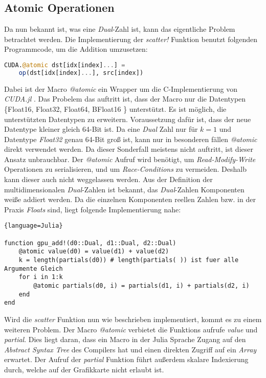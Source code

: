 \subsection{Atomic Operationen} \label{sec:atomic}

Da nun bekannt ist, was eine \textit{Dual}-Zahl ist, 
kann das eigentliche Problem betrachtet werden.
Die Implementierung der \textit{scatter!} Funktion benutzt folgenden Programmcode, um die 
Addition umzusetzen:

\begin{lstlisting}[language=Julia]
CUDA.@atomic dst[idx[index]...] = 
	op(dst[idx[index]...], src[index])
\end{lstlisting}


Dabei ist der Macro \textit{@atomic} ein Wrapper um die C-Implementierung von \textit{CUDA.jl} \cite{besard2018juliagpu}.
Das Probelem das auftritt ist, dass der Macro nur die Datentypen \{Float16, Float32, Float64, BFloat16 \}
unterstützt.
Es ist möglich, die unterstützten Datentypen zu erweitern.
Voraussetzung dafür ist, dass der neue Datentype kleiner gleich 64-Bit ist.
Da eine \textit{Dual} Zahl nur für $k = 1$ und Datentype \textit{Float32} genau 64-Bit groß ist,
kann nur in besonderen fällen \textit{@atomic} direkt verwendet werden.
Da dieser Sonderfall meistens nicht auftritt, ist dieser Ansatz unbrauchbar.
Der \textit{@atomic} Aufruf wird benötigt,
um \textit{Read-Modify-Write} Operationen zu serialisieren, 
und um \textit{Race-Conditions} zu vermeiden. 
Deshalb kann dieser auch nicht weggelassen werden.
Aus der Definition der multidimensionalen \textit{Dual}-Zahlen 
ist bekannt, das \textit{Dual}-Zahlen Komponenten weiße addiert werden.
Da die einzelnen Komponenten reellen Zahlen 
bzw. in der Praxis \textit{Floats} sind, liegt folgende Implementierung nahe:

\begin{lstlisting}{language=Julia}

function gpu_add!(d0::Dual, d1::Dual, d2::Dual)
	@atomic value(d0) = value(d1) + value(d2)
	k = length(partials(d0)) # length(partials( )) ist fuer alle Argumente Gleich
	for i in 1:k
		@atomic partials(d0, i) = partials(d1, i) + partials(d2, i)
	end
end

\end{lstlisting}

Wird die \textit{scatter} Funktion nun wie beschrieben implementiert, kommt es zu einem weiteren Problem.
Der Macro \textit{@atomic} verbietet die Funktions aufrufe \textit{value} und \textit{partial}.
Dies liegt daran, dass ein Macro in der Julia Sprache Zugang auf den \textit{Abstract Syntax Tree} des Compilers hat
und einen direkten Zugriff auf ein \textit{Array} erwartet.
Der Aufruf der \textit{partial} Funktion führt außerdem skalare Indexierung durch, welche auf der Grafikkarte nicht erlaubt ist.